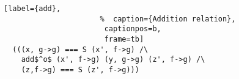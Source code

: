 \begin{figure}[!t]
  \centering
  \begin{minipage}{\columnwidth}
    \begin{lstlisting}[label={add},
                      %  caption={Addition relation},
                       captionpos=b,
                       frame=tb]
  (((x, g->g) === S (x', f->g) /\
    add$^o$ (x', f->g) (y, g->g) (z', f->g) /\
    (z,f->g) === S (z', f->g)))
    \end{lstlisting}
  \end{minipage}
\end{figure}